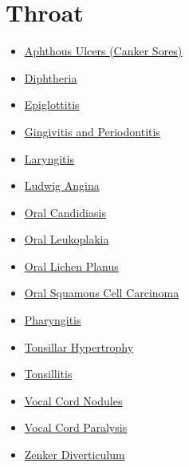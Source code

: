 \section*{Throat}
\label{sec:organ_throat}
\begin{itemize}[noitemsep]
  \item \hyperlink{sec:Aphthous Ulcers (Canker Sores)}{Aphthous Ulcers (Canker Sores)}
  \item \hyperlink{sec:throat:Diphtheria}{Diphtheria}
  \item \hyperlink{throat:Epiglottitis}{Epiglottitis}
  \item \hyperlink{sec:Gingivitis and Periodontitis}{Gingivitis and Periodontitis}
  \item \hyperlink{sec:Laryngitis}{Laryngitis}
  \item \hyperlink{sec:Ludwig Angina}{Ludwig Angina}
  \item \hyperlink{sec:Oral Candidiasis}{Oral Candidiasis}
  \item \hyperlink{sec:Oral Leukoplakia}{Oral Leukoplakia}
  \item \hyperlink{sec:Oral Lichen Planus}{Oral Lichen Planus}
  \item \hyperlink{sec:Oral Squamous Cell Carcinoma}{Oral Squamous Cell Carcinoma}
  \item \hyperlink{sec:Pharyngitis}{Pharyngitis}
  \item \hyperlink{sec:Tonsillar Hypertrophy}{Tonsillar Hypertrophy}
  \item \hyperlink{sec:Tonsillitis}{Tonsillitis}
  \item \hyperlink{sec:Vocal Cord Nodules}{Vocal Cord Nodules}
  \item \hyperlink{sec:Vocal Cord Paralysis}{Vocal Cord Paralysis}
  \item \hyperlink{sec:Zenker Diverticulum}{Zenker Diverticulum}
\end{itemize}

